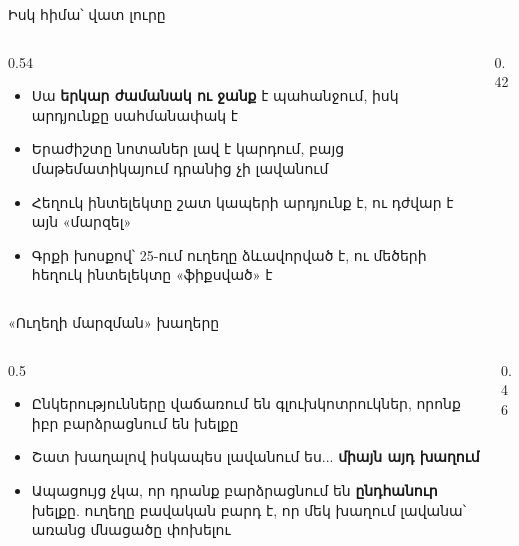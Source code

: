 \begin{frame}{Իսկ հիմա՝ վատ լուրը}
  \begin{columns}[T]
    \begin{column}{0.54\textwidth}
      \begin{itemize}
        \item Սա \textbf{երկար ժամանակ ու ջանք} է պահանջում, իսկ արդյունքը սահմանափակ է
        \item<2-> Երաժիշտը նոտաներ լավ է կարդում, բայց մաթեմատիկայում դրանից չի լավանում
        \item<3-> Հեղուկ ինտելեկտը շատ կապերի արդյունք է, ու դժվար է այն «մարզել»
        \item<4-> Գրքի խոսքով՝ 25-ում ուղեղը ձևավորված է, ու մեծերի հեղուկ ինտելեկտը «ֆիքսված» է
      \end{itemize}
    \end{column}
    \begin{column}{0.42\textwidth}
    \end{column}
  \end{columns}
\end{frame}

\begin{frame}{«Ուղեղի մարզման» խաղերը}
  \begin{columns}[T]
    \begin{column}{0.5\textwidth}
      \begin{itemize}
        \item Ընկերությունները վաճառում են գլուխկոտրուկներ, որոնք իբր բարձրացնում են խելքը
        \item<2-> Շատ խաղալով իսկապես լավանում ես... \textbf{միայն այդ խաղում}
        \item<3-> Ապացույց չկա, որ դրանք բարձրացնում են \textbf{ընդհանուր} խելքը. ուղեղը բավական բարդ է, որ մեկ խաղում լավանա՝ առանց մնացածը փոխելու
      \end{itemize}
    \end{column}
    \begin{column}{0.46\textwidth}
    \end{column}
  \end{columns}
\end{frame}

